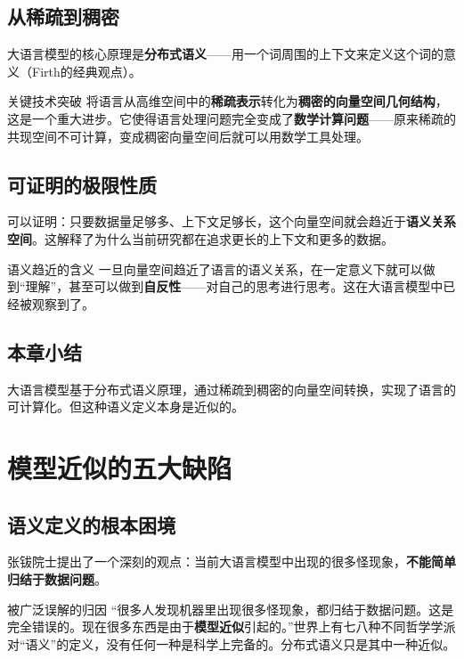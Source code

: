 \documentclass[a4paper]{article}
\begin{document}
\subsection{从稀疏到稠密}

大语言模型的核心原理是\textbf{分布式语义}——用一个词周围的上下文来定义这个词的意义（Firth的经典观点）。

\begin{knowledgebox}{关键技术突破}
将语言从高维空间中的\textbf{稀疏表示}转化为\textbf{稠密的向量空间几何结构}，这是一个重大进步。它使得语言处理问题完全变成了\textbf{数学计算问题}——原来稀疏的共现空间不可计算，变成稠密向量空间后就可以用数学工具处理。
\end{knowledgebox}

\subsection{可证明的极限性质}

可以证明：只要数据量足够多、上下文足够长，这个向量空间就会趋近于\textbf{语义关系空间}。这解释了为什么当前研究都在追求更长的上下文和更多的数据。

\begin{importantbox}{语义趋近的含义}
一旦向量空间趋近了语言的语义关系，在一定意义下就可以做到``理解''，甚至可以做到\textbf{自反性}——对自己的思考进行思考。这在大语言模型中已经被观察到了。
\end{importantbox}

\subsection{本章小结}

大语言模型基于分布式语义原理，通过稀疏到稠密的向量空间转换，实现了语言的可计算化。但这种语义定义本身是近似的。


\section{模型近似的五大缺陷}

\subsection{语义定义的根本困境}

张钹院士提出了一个深刻的观点：当前大语言模型中出现的很多怪现象，\textbf{不能简单归结于数据问题}。

\begin{warningbox}{被广泛误解的归因}
``很多人发现机器里出现很多怪现象，都归结于数据问题。这是完全错误的。现在很多东西是由于\textbf{模型近似}引起的。''世界上有七八种不同哲学学派对``语义''的定义，没有任何一种是科学上完备的。分布式语义只是其中一种近似。
\end{warningbox}
\end{document}
